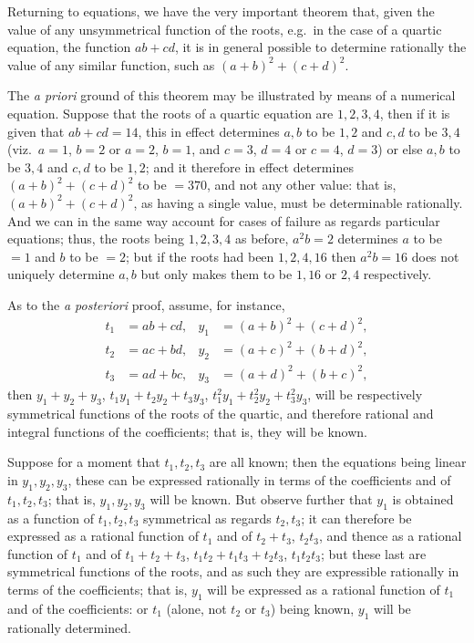 \documentclass[11pt,a4paper]{article}
\begin{document}
Returning to equations, we have the very important theorem that, given the value of any unsymmetrical function of the roots, e.g.\ in the case of a quartic equation, the function $ab + cd$, it is in general possible to determine rationally the value of any similar function, such as $(a + b)^{2} + (c + d)^{2}$.

The \textit{a priori} ground of this theorem may be illustrated by means of a numerical equation. Suppose that the roots of a quartic equation are $1, 2, 3, 4$, then if it is given that $ab + cd = 14$, this in effect determines $a, b$ to be $1, 2$ and $c, d$ to be $3, 4$ (viz.\ $a = 1$, $b = 2$ or $a = 2$, $b = 1$, and $c = 3$, $d = 4$ or $c = 4$, $d = 3$) or else $a, b$ to be $3, 4$ and $c, d$ to be $1, 2$; and it therefore in effect determines $(a + b)^{2} + (c + d)^{2}$ to be $= 370$, and not any other value: that is, $(a + b)^{2} + (c + d)^{2}$, as having a single value, must be determinable rationally. And we can in the same way account for cases of failure as regards particular equations; thus, the roots being $1, 2, 3, 4$ as before, $a^{2}b = 2$ determines $a$ to be $= 1$ and $b$ to be $= 2$; but if the roots had been $1, 2, 4, 16$ then $a^{2}b = 16$ does not uniquely determine $a, b$ but only makes them to be $1, 16$ or $2, 4$ respectively.

As to the \textit{a posteriori} proof, assume, for instance,
\begin{align*}
t_{1} &= ab + cd, & y_{1} &= (a + b)^{2} + (c + d)^{2}, \\
t_{2} &= ac + bd, & y_{2} &= (a + c)^{2} + (b + d)^{2}, \\
t_{3} &= ad + bc, & y_{3} &= (a + d)^{2} + (b + c)^{2},
\end{align*}
then $y_{1} + y_{2} + y_{3}$, $t_{1}y_{1} + t_{2}y_{2} + t_{3}y_{3}$, $t_{1}^{2}y_{1} + t_{2}^{2}y_{2} + t_{3}^{2}y_{3}$, will be respectively symmetrical functions of the roots of the quartic, and therefore rational and integral functions of the coefficients; that is, they will be known.

Suppose for a moment that $t_{1}, t_{2}, t_{3}$ are all known; then the equations being linear in $y_{1}, y_{2}, y_{3}$, these can be expressed rationally in terms of the coefficients and of $t_{1}, t_{2}, t_{3}$; that is, $y_{1}, y_{2}, y_{3}$ will be known. But observe further that $y_{1}$ is obtained as a function of $t_{1}, t_{2}, t_{3}$ symmetrical as regards $t_{2}, t_{3}$; it can therefore be expressed as a rational function of $t_{1}$ and of $t_{2} + t_{3}$, $t_{2}t_{3}$, and thence as a rational function of $t_{1}$ and of $t_{1} + t_{2} + t_{3}$, $t_{1}t_{2} + t_{1}t_{3} + t_{2}t_{3}$, $t_{1}t_{2}t_{3}$; but these last are symmetrical functions of the roots, and as such they are expressible rationally in terms of the coefficients; that is, $y_{1}$ will be expressed as a rational function of $t_{1}$ and of the coefficients: or $t_{1}$ (alone, not $t_{2}$ or $t_{3}$) being known, $y_{1}$ will be rationally determined.
\end{document}

